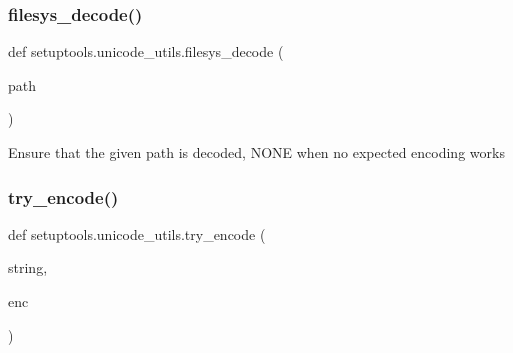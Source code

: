 \subsubsection{\texorpdfstring{filesys\+\_\+decode()}{filesys\_decode()}}
{\footnotesize\ttfamily def setuptools.\+unicode\+\_\+utils.\+filesys\+\_\+decode (\begin{DoxyParamCaption}\item[{}]{path }\end{DoxyParamCaption})}

\begin{DoxyVerb}Ensure that the given path is decoded,
NONE when no expected encoding works
\end{DoxyVerb}
 \mbox{\label{namespacesetuptools_1_1unicode__utils_aa8cee81a221e36526de668605979ef31}} 
\subsubsection{\texorpdfstring{try\+\_\+encode()}{try\_encode()}}
{\footnotesize\ttfamily def setuptools.\+unicode\+\_\+utils.\+try\+\_\+encode (\begin{DoxyParamCaption}\item[{}]{string,  }\item[{}]{enc }\end{DoxyParamCaption})}


